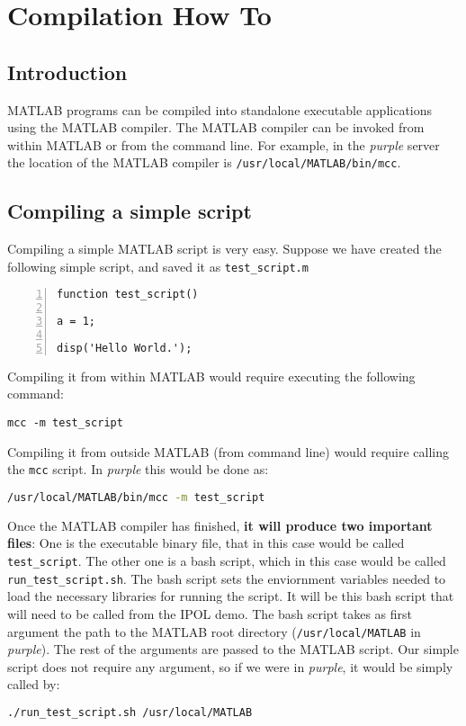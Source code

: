 \section{Compilation How To}\label{sec:compilation}
\subsection{Introduction}
MATLAB programs can be compiled into standalone executable applications using
the MATLAB compiler.  The MATLAB compiler can be invoked from within MATLAB or
from the command line. For example, in the \emph{purple} server the location of the
MATLAB compiler is \texttt{/usr/local/MATLAB/bin/mcc}.

\subsection{Compiling a simple script}
Compiling a simple MATLAB script is very easy. Suppose we have created the
following simple script, and saved it as \texttt{test\_script.m}
\begin{lstlisting}[numbers=left,title={First version of \texttt{test\_script.m}},captionpos=b]
function test_script()

a = 1;

disp('Hello World.');
\end{lstlisting}

Compiling it from within MATLAB would require executing the following command:

\begin{lstlisting}
mcc -m test_script
\end{lstlisting}

Compiling it from outside MATLAB (from command line) would require calling the
\texttt{mcc} script. In \emph{purple} this would be done as:

\begin{lstlisting}[language=bash]
/usr/local/MATLAB/bin/mcc -m test_script
\end{lstlisting}


Once the MATLAB compiler has finished, \textbf{it will produce two important
  files}: One is the executable binary file, that in this case would be called
\texttt{test\_script}. The other one is a bash script, which in this case would
be called \texttt{run\_test\_script.sh}. The bash script sets the enviornment
variables needed to load the necessary libraries for running the script. It will
be this bash script that will need to be called from the IPOL demo.  The bash
script takes as first argument the path to the MATLAB root directory
(\texttt{/usr/local/MATLAB} in \emph{purple}). The rest of the arguments are passed to
the MATLAB script. Our simple script does not require any argument, so if we
were in \emph{purple}, it would be simply called by:
\begin{lstlisting}[language=bash]
./run_test_script.sh /usr/local/MATLAB
\end{lstlisting}


